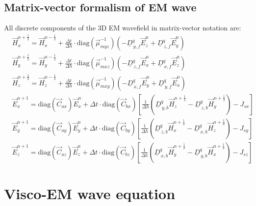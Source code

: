 \documentclass[pdftex,a4paper,parskip,listof=totoc,bibliography=totoc,onehalfspacing,12pt]{scrreprt}
\begin{document}
\section{Matrix-vector formalism of EM wave}
All discrete components of the 3D EM wavefield in matrix-vector notation are: 
\begin{equation}
\begin{aligned}
  &\vec{H}_{x}^{n+\frac{1}{2}} = \vec{H}_{x}^{n-\frac{1}{2}} + \frac{\Delta t}{\Delta h} \cdot  \mathrm{diag} \left(\vec{\mu}_{myz}^{-1}\right)  \left(- \underline{D}_{\,y,f}^q \vec{E}_{z}^{n} + \underline{D}_{\,z,f}^q \vec{E}_{y}^{n} \right)\\
  &\vec{H}_{y}^{n+\frac{1}{2}} = \vec{H}_{y}^{n-\frac{1}{2}} + \frac{\Delta t}{\Delta h} \cdot  \mathrm{diag} \left(\vec{\mu}_{mxz}^{-1}\right)  \left(- \underline{D}_{\,z,f}^q \vec{E}_{x}^{n} + \underline{D}_{\,x,f}^q \vec{E}_z^{n} \right)\\
  &\vec{H}_{z}^{n+\frac{1}{2}} = \vec{H}_{z}^{n-\frac{1}{2}} + \frac{\Delta t}{\Delta h} \cdot  \mathrm{diag} \left(\vec{\mu}_{mxy}^{-1}\right)  \left(- \underline{D}_{\,x,f}^q \vec{E}_y^{n} + \underline{D}_{\,y,f}^q \vec{E}_x^{n} \right)\\
  &\vec{E}_{x}^{n+1} =  \mathrm{diag} \left(\vec{C}_{ax}\right) \vec{E}_{x}^{n} + \Delta t \cdot  \mathrm{diag} \left(\vec{C}_{bx}\right) \left[ \frac{1}{\Delta h} \left( \underline{D}_{\,y,b}^q \vec{H}_z^{n+\frac{1}{2}} - \underline{D}_{\,z,b}^q \vec{H}_y^{n+\frac{1}{2}} \right) - J_{sx} \right]\\
  &\vec{E}_{y}^{n+1} =  \mathrm{diag} \left(\vec{C}_{ay}\right) \vec{E}_{y}^{n} + \Delta t \cdot  \mathrm{diag} \left(\vec{C}_{by}\right) \left[ \frac{1}{\Delta h} \left( \underline{D}_{\,z,b}^q  \vec{H}_x^{n+\frac{1}{2}} - \underline{D}_{\,x,b}^q \vec{H}_z^{n+\frac{1}{2}} \right) - J_{sy} \right]\\
  &\vec{E}_{z}^{n+1} =  \mathrm{diag} \left(\vec{C}_{az}\right) \vec{E}_{z}^{n} + \Delta t \cdot  \mathrm{diag} \left(\vec{C}_{bz}\right) \left[ \frac{1}{\Delta h} \left( \underline{D}_{\,x,b}^q \vec{H}_y^{n+\frac{1}{2}} - \underline{D}_{\,y,b}^q \vec{H}_x^{n+\frac{1}{2}} \right) - J_{sz} \right]
\end{aligned}
\end{equation}

\chapter{Visco-EM wave equation}
\label{sec:Visco_EM_wave_equation}
\end{document}
